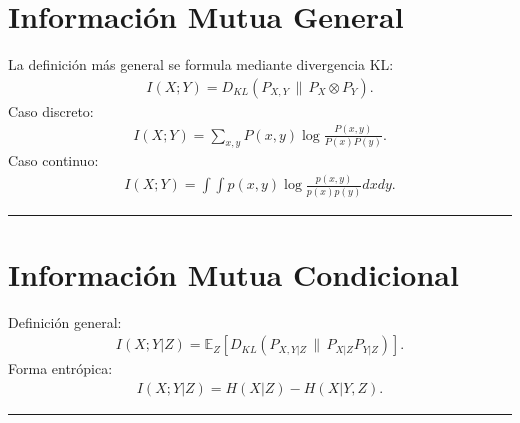 \documentclass[letterpaper,10pt,english]{jupyterBook}
\begin{document}
\section{Información Mutua General}
\label{\detokenize{02_mathematical_foundations/formal_definitions:informacion-mutua-general}}
\sphinxAtStartPar
La definición más general se formula mediante divergencia KL:
\begin{equation*}
\begin{split}
I(X;Y)=D_{KL}(P_{X,Y}\,\|\,P_X\otimes P_Y).
\end{split}
\end{equation*}
\sphinxAtStartPar
Caso discreto:
\begin{equation*}
\begin{split}
I(X;Y)=\sum_{x,y}P(x,y)
\log\frac{P(x,y)}{P(x)P(y)}.
\end{split}
\end{equation*}
\sphinxAtStartPar
Caso continuo:
\begin{equation*}
\begin{split}
I(X;Y)=\int\int p(x,y)\log
\frac{p(x,y)}{p(x)p(y)}dxdy.
\end{split}
\end{equation*}

\bigskip\hrule\bigskip



\section{Información Mutua Condicional}
\label{\detokenize{02_mathematical_foundations/formal_definitions:informacion-mutua-condicional}}
\sphinxAtStartPar
Definición general:
\begin{equation*}
\begin{split}
I(X;Y|Z)=
\mathbb{E}_Z
\left[
D_{KL}(P_{X,Y|Z}\,\|\,P_{X|Z}P_{Y|Z})
\right].
\end{split}
\end{equation*}
\sphinxAtStartPar
Forma entrópica:
\begin{equation*}
\begin{split}
I(X;Y|Z)=H(X|Z)-H(X|Y,Z).
\end{split}
\end{equation*}

\bigskip\hrule\bigskip
\end{document}
